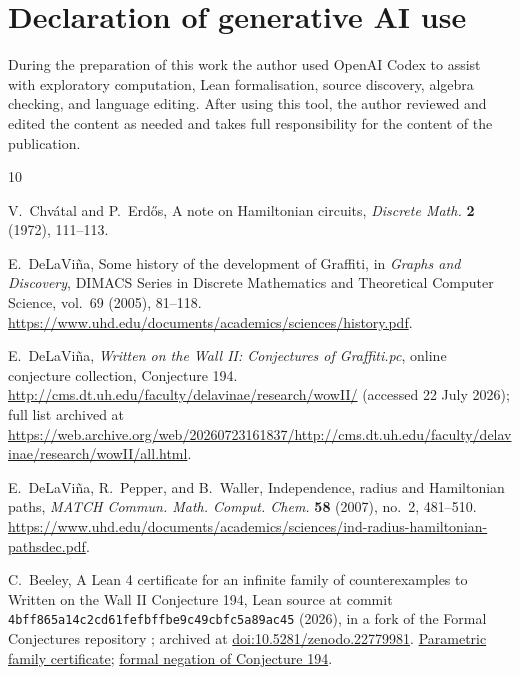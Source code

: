 \documentclass[11pt]{article}
\newcommand{\doi}[1]{\href{https://doi.org/#1}{doi:#1}}
\begin{document}
\section*{Declaration of generative AI use}
During the preparation of this work the author used OpenAI Codex to assist with exploratory
computation, Lean formalisation, source discovery, algebra checking, and language editing.
After using this tool, the author reviewed and edited the content as needed and takes full
responsibility for the content of the publication.

\small
\begin{thebibliography}{10}
\setlength{\itemsep}{0pt plus 1pt}

V.~Chv{\'a}tal and P.~Erd{\H o}s,
\newblock A note on {H}amiltonian circuits,
\newblock \emph{Discrete Math.} \textbf{2} (1972), 111--113.

E.~DeLaVi{\~n}a,
\newblock Some history of the development of {Graffiti},
\newblock in \emph{Graphs and Discovery}, DIMACS Series in Discrete Mathematics and
  Theoretical Computer Science, vol.~69 (2005), 81--118.
\newblock \url{https://www.uhd.edu/documents/academics/sciences/history.pdf}.

E.~DeLaVi{\~n}a,
\newblock \emph{Written on the Wall {II}: Conjectures of {Graffiti.pc}},
\newblock online conjecture collection, Conjecture 194.
\newblock \url{http://cms.dt.uh.edu/faculty/delavinae/research/wowII/}
  (accessed 22 July 2026); full list archived at
  \url{https://web.archive.org/web/20260723161837/http://cms.dt.uh.edu/faculty/delavinae/research/wowII/all.html}.

E.~DeLaVi{\~n}a, R.~Pepper, and B.~Waller,
\newblock Independence, radius and Hamiltonian paths,
\newblock \emph{MATCH Commun. Math. Comput. Chem.} \textbf{58} (2007), no.~2,
  481--510.
\newblock \url{https://www.uhd.edu/documents/academics/sciences/ind-radius-hamiltonian-pathsdec.pdf}.

C.~Beeley,
\newblock A {Lean 4} certificate for an infinite family of counterexamples to Written on
  the Wall {II} Conjecture 194,
\newblock Lean source at commit
  \texttt{4bff865a14c2cd61fefbffbe9c49cbfc5a89ac45} (2026), in a fork of the Formal
  Conjectures repository \cite{formalconjecturesrepo}; archived at
  \doi{10.5281/zenodo.22779981}.
\newblock \href{https://github.com/anagnorisis2peripeteia/formal-conjectures/blob/4bff865a14c2cd61fefbffbe9c49cbfc5a89ac45/FormalConjectures/WrittenOnTheWallII/Proofs/GraphConjecture194.lean\#L725-L735}{Parametric family certificate};
\href{https://github.com/anagnorisis2peripeteia/formal-conjectures/blob/4bff865a14c2cd61fefbffbe9c49cbfc5a89ac45/FormalConjectures/WrittenOnTheWallII/GraphConjecture194.lean\#L128-L140}{formal negation of Conjecture 194}.


\end{thebibliography}
\end{document}
